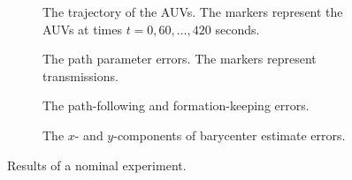 \begin{figure}[t]
    \begin{minipage}{0.48\textwidth}
        \begin{subfigure}{\textwidth}
            
            \vspace{-3mm}
            \caption{The trajectory of the AUVs. The markers represent the AUVs at times $t = 0, 60, \ldots, 420$ seconds.}
            \label{fig:distr_NSB_experiment_nominal_trajectory}
        \end{subfigure}


        \begin{subfigure}{\textwidth}
            
            \vspace{-7mm}
            \caption{The path parameter errors. The markers represent transmissions.}
            \label{fig:distr_NSB_experiment_nominal_parameter}
        \end{subfigure}
    \end{minipage}
    \hspace{\fill}
    \begin{minipage}{0.48\textwidth}

        \hspace*{\fill}
        \begin{subfigure}{\textwidth}
            
            \vspace{-7mm}
            \caption{The path-following and formation-keeping errors.}
            \label{fig:distr_NSB_experiment_nominal_errors}
        \end{subfigure}


        \hspace*{\fill}
        \begin{subfigure}{\textwidth}
            
            \vspace{-7mm}
            \caption{The $x$- and $y$-components of barycenter estimate errors.}
            \label{fig:distr_NSB_experiment_nominal_barycenter}
        \end{subfigure}
    \end{minipage}

    \caption{Results of a nominal experiment.}
    \label{fig:distr_NSB_experiment_nominal}
\end{figure}
